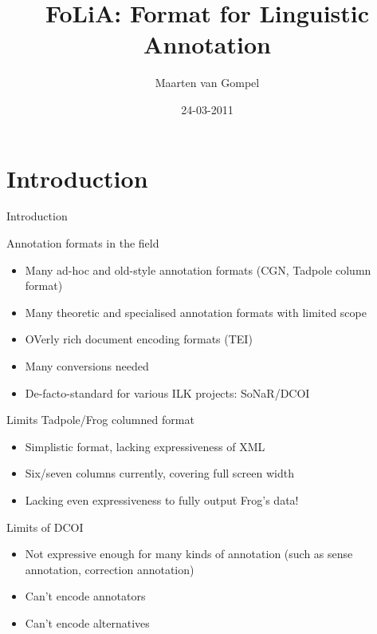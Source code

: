 \documentclass[compress]{beamer}
\title{FoLiA: Format for Linguistic Annotation}
\author{Maarten van Gompel}
\date{24-03-2011}
\begin{document}
\begin{frame}
	\titlepage\smallraccoon\ilkuvt
\end{frame}

\section{Introduction}

\begin{frame}{Introduction}

    \begin{block}{Annotation formats in the field}
        \begin{itemize}
            \item Many ad-hoc and old-style annotation formats (CGN, Tadpole column format) 
            \item Many theoretic and specialised annotation formats with limited scope
            \item OVerly rich document encoding formats (TEI)
            \item Many conversions needed
            \item De-facto-standard for various ILK projects: SoNaR/DCOI
        \end{itemize}
    \end{block}

\end{frame}
    
\begin{frame}

    \begin{block}{Limits Tadpole/Frog columned format}
        \begin{itemize}
            \item Simplistic format, lacking expressiveness of XML
            \item Six/seven columns currently, covering full screen width
            \item Lacking even expressiveness to fully output Frog's data!
        \end{itemize}
    \end{block}
    
\end{frame}
    
    
\begin{frame}
    \begin{block}{Limits of DCOI}
        \begin{itemize}
            \item Not expressive enough for many kinds of annotation (such as sense annotation, correction annotation)
            \item Can't encode annotators
            \item Can't encode alternatives
        \end{itemize}
    \end{block}
    
\end{frame}    
\end{document}
